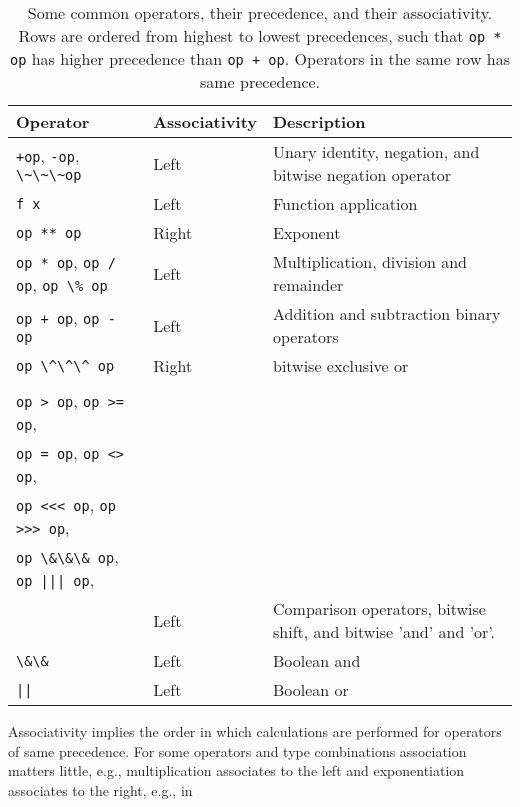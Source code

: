 \begin{table}
  \centering
  \begin{tabularx}{\linewidth}{|l|l|X|}
    \hline
    Operator & Associativity & Description\\
    \hline
    \lstinline|+op|, \lstinline|-op|, \lstinline|\~\~\~op| & Left & Unary identity, negation, and bitwise negation operator\\
    \hline
    \lstinline|f x| & Left & Function application\\
    \hline
    \lstinline|op ** op| & Right & Exponent\\ 
    \hline
    \lstinline|op * op|, \lstinline|op / op|, \lstinline|op \% op| & Left & Multiplication, division and remainder\\
    \hline
    \lstinline|op + op|, \lstinline|op - op| & Left & Addition and subtraction binary operators\\
    \hline
    \lstinline|op \^\^\^ op| & Right & bitwise exclusive or\\
    \hline
    \begin{minipage}[t]{0.25\linewidth}
      \lstinline|op < op|, \lstinline|op <= op|,\\
      \lstinline|op > op|, \lstinline|op >= op|,\\
      \lstinline|op = op|, \lstinline|op <> op|,\\
      \lstinline|op <<< op|, \lstinline|op >>> op|,\\
      \lstinline|op \&\&\& op|, \lstinline!op ||| op!,\\
    \end{minipage}
             & Left & Comparison operators, bitwise shift, and bitwise 'and' and 'or'.\\
    \hline
    \lstinline|\&\&| & Left & Boolean and\\
    \hline
    \lstinline+||+ & Left & Boolean or\\
    \hline
  \end{tabularx}
  \caption{Some common operators, their precedence, and their associativity. Rows are ordered from highest to lowest precedences, such that \lstinline|op * op| has higher precedence than \lstinline|op + op|. Operators in the same row has same precedence. }
  \label{tab:operatorPrecedence}
\end{table}
Associativity implies the order in which calculations are performed for operators of same precedence. For some operators and type combinations association matters little, e.g., multiplication associates to the left and exponentiation associates to the right, e.g., in
